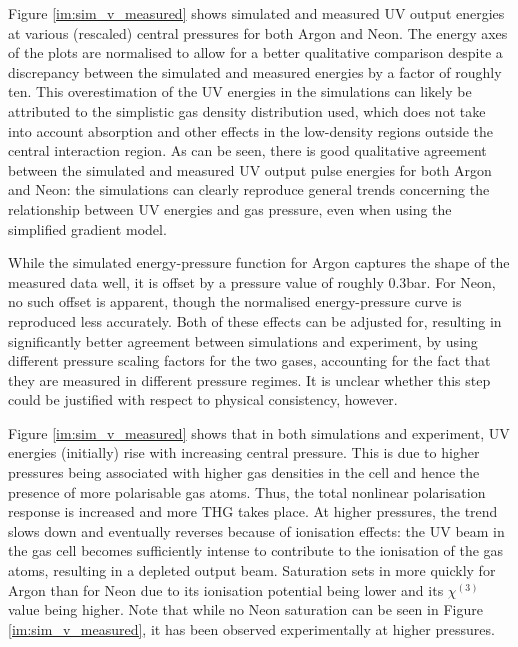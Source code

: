 \documentclass[a4paper]{jpconf}
\begin{document}
Figure \ref{im:sim_v_measured} shows simulated and measured UV output energies at various (rescaled) central pressures for both Argon and Neon. The energy axes of the plots are normalised to allow for a better qualitative comparison despite a discrepancy between the simulated and measured energies by a factor of roughly ten. This overestimation of the UV energies in the simulations can likely be attributed to the simplistic gas density distribution used, which does not take into account absorption and other effects in the low-density regions outside the central interaction region. As can be seen, there is good qualitative agreement between the simulated and measured UV output pulse energies for both Argon and Neon: the simulations can clearly reproduce general trends concerning the relationship between UV energies and gas pressure, even when using the simplified gradient model. \par 
While the simulated energy-pressure function for Argon captures the shape of the measured data well, it is offset by a pressure value of roughly 0.3bar. For Neon, no such offset is apparent, though the normalised energy-pressure curve is reproduced less accurately.   Both of these effects can be adjusted for, resulting in significantly better agreement between simulations and experiment, by using different pressure scaling factors for the two gases, accounting for the fact that they are measured in different pressure regimes. It is unclear whether this step could be justified with respect to physical consistency, however. \par 
Figure \ref{im:sim_v_measured} shows that in both simulations and experiment, UV energies (initially) rise with increasing central pressure. This is due to higher pressures being associated with higher gas densities in the cell and hence the presence of more polarisable gas atoms. Thus, the total nonlinear polarisation response is increased and more THG takes place. At higher pressures, the trend slows down and eventually reverses because of ionisation effects: the UV beam in the gas cell becomes sufficiently intense to contribute to the ionisation of the gas atoms, resulting in a depleted output beam. Saturation sets in more quickly for Argon than for Neon due to its ionisation potential being lower and its $\chi^{(3)}$ value being higher. Note that while no Neon saturation can be seen in Figure \ref{im:sim_v_measured}, it has been observed experimentally at higher pressures.  \par 
\end{document}
